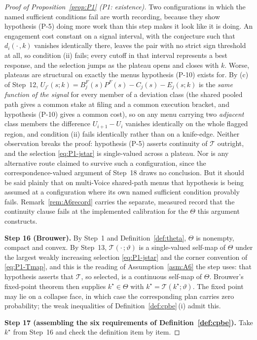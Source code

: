 \documentclass[11pt]{article}
\newcommand{\Tmap}{\mathcal{T}}
\begin{document}
\begin{proof}[Proof of Proposition~\ref{prop:P1} (P1: existence)]
Two configurations in which the named sufficient conditions fail are worth recording, because they
show hypothesis (P-5) doing more work than this step makes it look like it is doing. An engagement
cost constant on a signal interval, with the conjecture such that $d_i(\cdot\,,k)$ vanishes
identically there, leaves the pair with no strict sign threshold at all, so condition (ii) fails;
every cutoff in that interval represents a best response, and the selection jumps as the plateau
opens and closes with $k$. Worse, plateaus are structural on exactly the menus
hypothesis (P-10) exists for. By (c) of Step~12,
$U_{j'}(s;k) = B_j^F(s)P^F(s)-C_j(s)-E_j(s;k)$ is the \emph{same function of the signal} for every
member of a deviation class (the shared pooled path gives a common stake at filing and a common
execution bracket, and hypothesis (P-10) gives a common cost), so on any menu carrying two
\emph{adjacent} class members the difference $U_{i+1}-U_i$ vanishes identically on the whole flagged
region, and condition (ii) fails identically rather than on a knife-edge. Neither observation breaks
the proof: hypothesis (P-5) asserts continuity of $\Tmap$ outright, and the selection
\eqref{eq:P1-jstar} is single-valued across a plateau. Nor is any alternative route claimed to
survive such a configuration, since the correspondence-valued argument of Step~18 draws no
conclusion. But it should be said plainly that on multi-Voice shared-path menus that hypothesis is
being assumed at a configuration where its own named sufficient condition provably fails.
Remark~\ref{rem:A6record} carries the separate, measured record that the continuity clause fails at
the implemented calibration for the $\Theta$ this argument constructs.

\smallskip
\noindent\textbf{Step 16 (Brouwer).}
By Step~1 and Definition~\ref{def:theta}, $\Theta$ is nonempty, compact and convex. By Step~13,
$\Tmap(\cdot\,;\vartheta)$ is a single-valued self-map of $\Theta$ under the largest weakly
increasing selection \eqref{eq:P1-jstar} and the corner convention of \eqref{eq:P1-Tmap}, and this is
the reading of Assumption~\ref{asm:A6} the step uses: that hypothesis asserts that $\Tmap$, so
selected, is a continuous self-map of $\Theta$. Brouwer's fixed-point theorem then supplies
$k^\star \in \Theta$ with $k^\star = \Tmap(k^\star;\vartheta)$. The fixed point may lie on a collapse
face, in which case the corresponding plan carries zero probability; the weak inequalities of
Definition~\ref{def:cpbe}\,(i) admit this.

\smallskip
\noindent\textbf{Step 17 (assembling the six requirements of Definition~\ref{def:cpbe}).}
Take $k^\star$ from Step~16 and check the definition item by item.


\end{proof}
\end{document}
